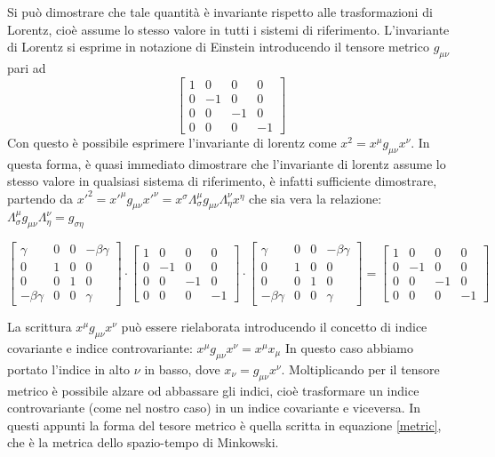 Si può dimostrare che tale quantità è invariante rispetto alle trasformazioni di Lorentz, cioè assume lo stesso valore in tutti i sistemi di riferimento.
L'invariante di Lorentz si esprime in notazione di Einstein introducendo il tensore metrico $g_{\mu \nu}$ pari ad 
\begin{equation} \label{metric}
\begin{bmatrix}
1 & 0 & 0 & 0 \\ 
0 & -1 & 0 & 0 \\ 
0 & 0 & -1 & 0 \\ 
0 & 0 & 0 &-1
\end{bmatrix}
\end{equation} 
Con questo è possibile esprimere l'invariante di lorentz come $x^2 = x^\mu g_{\mu \nu} x^\nu $. In questa forma, è quasi immediato dimostrare che l'invariante di lorentz assume lo stesso valore in qualsiasi sistema di riferimento, è infatti sufficiente dimostrare, partendo da $x'^2 =  x'^\mu g_{\mu \nu} x'^\nu = x^\sigma \Lambda^\mu _\sigma g_{\mu \nu} \Lambda^\nu _\eta x^\eta $ che sia vera la relazione:  $ \Lambda^\mu _\sigma g_{\mu \nu} \Lambda^\nu _\eta = g_{\sigma \eta}$ 

\[
\begin{bmatrix}
\gamma & 0 & 0 & -\beta \gamma \\ 
0 & 1 & 0 & 0 \\ 
0 & 0 & 1 & 0 \\ 
- \beta \gamma & 0 & 0 & \gamma
\end{bmatrix} 
\cdot 
\begin{bmatrix}
1 & 0 & 0 & 0 \\ 
0 & -1 & 0 & 0 \\ 
0 & 0 & -1 & 0 \\ 
0 & 0 & 0 &-1
\end{bmatrix}
\cdot
\begin{bmatrix}
\gamma & 0 & 0 & -\beta \gamma \\ 
0 & 1 & 0 & 0 \\ 
0 & 0 & 1 & 0 \\ 
- \beta \gamma & 0 & 0 & \gamma
\end{bmatrix} 
=
\begin{bmatrix}
1 & 0 & 0 & 0 \\ 
0 & -1 & 0 & 0 \\ 
0 & 0 & -1 & 0 \\ 
0 & 0 & 0 &-1
\end{bmatrix}
\]

La scrittura $ x^\mu g_{\mu \nu} x^\nu$ può essere rielaborata introducendo il concetto di indice covariante e indice controvariante: $ x^\mu g_{\mu \nu} x^\nu = x^\mu x_\mu$ 
In questo caso abbiamo portato l'indice in alto $\nu$ in basso, dove $x_\nu = g_{\mu \nu} x^\nu$. Moltiplicando per  il tensore metrico è possibile alzare od abbassare gli indici, cioè trasformare un indice controvariante (come nel nostro caso) in un indice covariante e viceversa. In questi appunti la forma del tesore metrico è  quella scritta in equazione \ref{metric}, che è la metrica dello spazio-tempo di Minkowski. 

